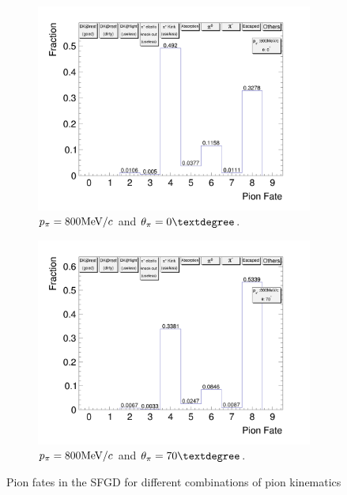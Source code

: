 \begin{figure}[t]
\begin{subfigure}{\dbfigwid\textwidth}
                    \label{subfig:pi-fate-300-70}
               \end{subfigure}
              \\
               \begin{subfigure}{\dbfigwid\textwidth}
                    \includegraphics[width=\textwidth]{figures/sel/pion_fate_800_0.png}
                    \caption{$p_{\pi}=800\textrm{MeV}/c$ and $\tpi=0\deg$.}
                    \label{subfig:pi-fate-800-0}
               \end{subfigure}
               \begin{subfigure}{\dbfigwid\textwidth}
                    \includegraphics[width=\textwidth]{figures/sel/pion_fate_800_70.png}
                    \caption{$p_{\pi}=800\textrm{MeV}/c$ and $\tpi=70\deg$.}
                    \label{subfig:pi-fate-800-70}
               \end{subfigure}
               \caption{Pion fates in the SFGD for different combinations of pion kinematics}
               \label{fig:pi-fate}
            \end{figure}
       
